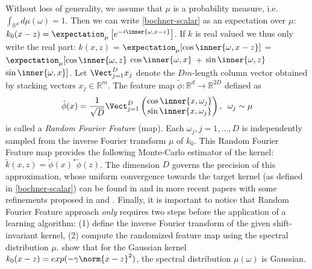 Without loss of generality, we assume that $\mu$ is a probability measure, i.e. $\int_{\mathbb{R}^d} d\mu(\omega)=1$.
Then we can write \cref{bochner-scalar} as an expectation over $\mu$: $k_0(x-z) = \expectation_{\mu}\left[e^{-i \inner{\omega,x - z}}\right]$.
If $k$ is real valued we thus only write the real part: $k(x,z)$ = $\expectation_{\mu}[\cos \inner{\omega,x - z}]$ =$\expectation_{\mu}[ \cos \inner{\omega,z}$ $\cos \inner{\omega,x}$ + $\sin \inner{\omega,z}$ $\sin \inner{\omega,x}]$.
Let $\Vect_{j=1}^D x_j$ denote the $Dm$-length column vector obtained by stacking vectors $x_j \in \mathbb{R}^m$. The feature map $\tilde{\phi}: \mathbb{R}^d \rightarrow \mathbb{R}^{2D}$ defined as
\begin{equation}\label{eq:rff}
\begin{aligned}
\tilde{\phi}(x)=\frac{1}{\sqrt{D}}\Vect_{j=1}^D\begin{pmatrix}\cos{\inner{x,\omega_j}} \\ \sin{\inner{x,\omega_j}}\end{pmatrix}, \enskip \omega_j \sim \mu
\end{aligned}
\end{equation}
is called a \emph{Random Fourier Feature} (map). Each $\omega_{j}, j=1, \ldots, D$ is independently sampled from the inverse Fourier transform $\mu$ of $k_0$.
This Random Fourier Feature map provides the following Monte-Carlo estimator of the kernel: $\tilde{k}(x, z) = \tilde{\phi}(x)^* \tilde{\phi}(z)$. The dimension $D$ governs the precision of this approximation, whose uniform convergence towards the target kernel (as defined in \cref{bochner-scalar}) can be found in \citet{Rahimi2007} and in more recent papers with some refinements proposed in \citet{sutherland2015} and \citet{sriper2015}.
Finally, it is important to notice that Random Fourier Feature approach \emph{only} requires two steps before the application of a learning algorithm: (1) define the inverse Fourier transform of the given shift-invariant kernel, (2) compute the randomized feature map using the spectral distribution $\mu$. \citet{Rahimi2007} show that for the Gaussian kernel $k_0(x-z) = exp(-\gamma \norm{x - z}^2)$, the spectral distribution $\mu(\omega)$ is Gaussian.

